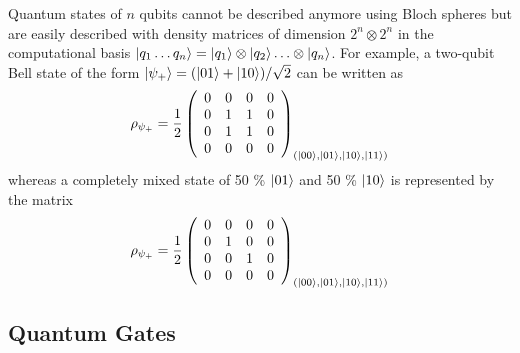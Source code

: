 \smallskip

Quantum states of $n$ qubits cannot be described anymore using Bloch spheres but are easily described with density matrices of dimension $2^n\otimes 2^n$ in the computational basis $\left| q_1\hdots q_n \right>=\left| q_1 \right>\otimes\left| q_{2} \right>\hdots\otimes\left| q_n \right>$. For example, a two-qubit Bell state of the form $\left| \psi_+ \right>=(\left| 01 \right>+\left| 10 \right>)/\sqrt{2}$ can be written as
%
\begin{equation}
\rho_{\psi_+} = \frac{1}{2}\left( \begin{array}{cccc} 0 & 0 & 0 & 0 \\ 0 & 1 & 1 & 0 \\ 0 & 1 & 1 & 0 \\ 0 & 0 & 0 & 0 \end{array} \right)_{(\left| 00 \right>,\left| 01 \right>,\left| 10 \right>,\left| 11 \right>)}
\end{equation}
%
whereas a completely mixed state of 50 \% $\left| 01 \right>$ and 50 \% $\left| 10 \right>$ is represented by the matrix
%
\begin{equation}
\rho_{\psi_+} = \frac{1}{2}\left( \begin{array}{cccc} 0 & 0 & 0 & 0 \\ 0 & 1 & 0 & 0 \\ 0 & 0 & 1 & 0 \\ 0 & 0 & 0 & 0 \end{array} \right)_{(\left| 00 \right>,\left| 01 \right>,\left| 10 \right>,\left| 11 \right>)}
\end{equation}
%

\subsection{Quantum Gates}

